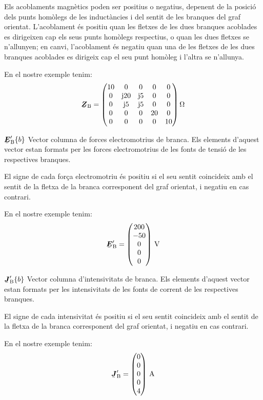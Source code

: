 \begin{list}{}
   Els acoblaments magnètics poden ser positius o negatius, depenent
    de la posició dels punts homòlegs de les inductàncies i del sentit
    de les branques del graf orientat. L'acoblament és positiu quan les
    fletxes de les dues branques acoblades es dirigeixen cap els seus punts
    homòlegs respectius, o quan les dues fletxes se n'allunyen; en canvi,
    l'acoblament és negatiu quan una de les fletxes de les dues branques
    acoblades es dirigeix cap el seu punt homòleg i l'altra se n'allunya.

   En el nostre exemple tenim:
   \[
      \mcmplx{Z}\ped{B} = \begin{pmatrix}
            10 & 0 & 0 & 0 & 0 \\
            0 & \ju 20 & \ju 5 & 0 & 0 \\
            0 & \ju 5 & \ju 5 & 0 & 0 \\
            0 & 0 & 0 & 20 & 0 \\
            0 & 0 & 0 & 0 & 10
      \end{pmatrix}\si{\ohm}
   \]

   \item[$\mcmplx{E}'\ped{B}\{b\}$] Vector columna de forces electromotrius de branca. Els elements d'aquest vector estan formats per les forces electromotrius de les fonts de tensió de les respectives branques.

El signe de cada força electromotriu és positiu si el seu sentit coincideix amb el sentit de la fletxa de la branca corresponent del graf orientat, i negatiu en cas contrari.

   En el nostre exemple tenim:
   \[
      \mcmplx{E}'\ped{B} = \begin{pmatrix} 200 \\ -50 \\ 0 \\ 0 \\ 0 \end{pmatrix}\unit{V}
   \]

   \item[$\mcmplx{J}'\ped{B}\{b\}$] Vector columna d'intensivitats de branca. Els elements d'aquest vector estan formats per les intensivitats de les fonts de corrent de les respectives branques.

El signe de cada intensivitat és positiu si el seu sentit coincideix amb el sentit de la fletxa de la branca corresponent del graf orientat, i negatiu en cas contrari.

   En el nostre exemple tenim:
   \[
      \mcmplx{J}'\ped{B} = \begin{pmatrix} 0 \\ 0 \\ 0 \\ 0 \\ 4 \end{pmatrix}\unit{A}
   \]

\end{list}

